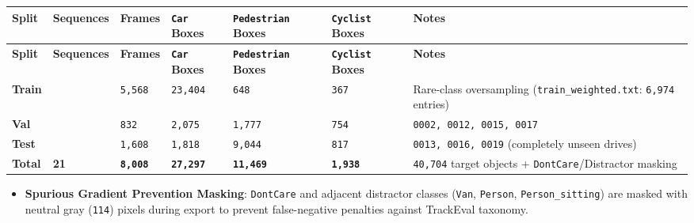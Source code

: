 \documentclass[10.5pt,a4paper]{article}
\begin{document}
\begin{footnotesize}
\setlength{\tabcolsep}{4pt}
\setlength{\LTleft}{0pt}\setlength{\LTright}{0pt}
\begin{longtable}{>{\raggedright\arraybackslash}p{} >{\raggedright\arraybackslash}p{} >{\raggedright\arraybackslash}p{} >{\raggedright\arraybackslash}p{} >{\raggedright\arraybackslash}p{} >{\raggedright\arraybackslash}p{} >{\raggedright\arraybackslash}p{}}
\toprule
\textbf{Split} & \textbf{Sequences} & \textbf{Frames} & \textbf{\texttt{Car} Boxes} & \textbf{\texttt{Pedestrian} Boxes} & \textbf{\texttt{Cyclist} Boxes} & \textbf{Notes} \\
\midrule
\endfirsthead
\toprule
\textbf{Split} & \textbf{Sequences} & \textbf{Frames} & \textbf{\texttt{Car} Boxes} & \textbf{\texttt{Pedestrian} Boxes} & \textbf{\texttt{Cyclist} Boxes} & \textbf{Notes} \\
\midrule
\endhead
\bottomrule
\endfoot
\textbf{Train} & 14 & \texttt{5,\allowbreak{}568} & \texttt{23,\allowbreak{}404} & \texttt{648} & \texttt{367} & Rare-class oversampling (\texttt{train\_\allowbreak{}weighted.\allowbreak{}txt}: \texttt{6,\allowbreak{}974} entries) \\
\textbf{Val} & 4 & \texttt{832} & \texttt{2,\allowbreak{}075} & \texttt{1,\allowbreak{}777} & \texttt{754} & \texttt{0002,\allowbreak{} 0012,\allowbreak{} 0015,\allowbreak{} 0017} \\
\textbf{Test} & 3 & \texttt{1,\allowbreak{}608} & \texttt{1,\allowbreak{}818} & \texttt{9,\allowbreak{}044} & \texttt{817} & \texttt{0013,\allowbreak{} 0016,\allowbreak{} 0019} (completely unseen drives) \\
\textbf{Total} & \textbf{21} & \textbf{\texttt{8,\allowbreak{}008}} & \textbf{\texttt{27,\allowbreak{}297}} & \textbf{\texttt{11,\allowbreak{}469}} & \textbf{\texttt{1,\allowbreak{}938}} & \texttt{40,\allowbreak{}704} target objects + \texttt{DontCare}/Distractor masking \\
\end{longtable}
\end{footnotesize}


\begin{itemize}[leftmargin=1.5em,itemsep=2pt]
\item \textbf{Spurious Gradient Prevention Masking}: \texttt{DontCare} and adjacent distractor classes (\texttt{Van}, \texttt{Person}, \texttt{Person\_\allowbreak{}sitting}) are masked with neutral gray (\texttt{114}) pixels during export to prevent false-negative penalties against TrackEval taxonomy.
\end{itemize}
\end{document}
